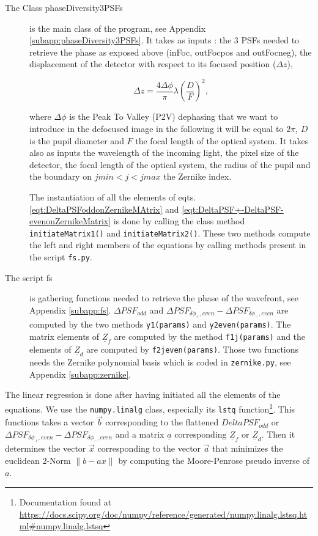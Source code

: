 \begin{description}
\item[The Class phaseDiversity3PSFs] is the main class of the program, see Appendix \ref{subapp:phaseDiversity3PSFs}. It takes as inputs : the 3 PSFs needed to retrieve the phase as exposed above (inFoc, outFocpos and outFocneg), the displacement of the detector with respect to its focused position ($\Delta z$),

\begin{equation}
\Delta z = \frac{4\Delta\phi}{\pi}\lambda \left(\frac{D}{F}\right)^2,
\label{eqt:Deltaz}
\end{equation}

where $\Delta\phi$ is the Peak To Valley (P2V) dephasing that we want to introduce in the defocused image in the following it will be equal to $2\pi$, $D$ is the pupil diameter and $F$ the focal length of the optical system. It takes also as inputs the wavelength of the incoming light, the pixel size of the detector, the focal length of the optical system, the radius of the pupil and the boundary on $jmin<j<jmax$ the Zernike index. 

The instantiation of all the elements of eqts. \eqref{eqt:DeltaPSFoddonZernikeMAtrix} and \eqref{eqt:DeltaPSF+-DeltaPSF-evenonZernikeMatrix} is done by calling the class method \verb!initiateMatrix1()! and \verb!initiateMatrix2()!. These two methods compute the left and right members of the equations by calling methods present in the script \verb!fs.py!.

\item[The script fs] is  gathering functions needed to retrieve the phase of the wavefront, see Appendix \ref{subapp:fs}. $\Delta PSF_{odd}$ and $\Delta PSF_{\delta\phi_+, even}-\Delta PSF_{\delta\phi_-, even}$ are computed by the two methods \verb!y1(params)! and \verb!y2even(params)!. The matrix elements of $\underline{Z}_f$ are computed by the method \verb!f1j(params)! and the elements of $\underline{Z}_d$ are computed by \verb!f2jeven(params)!. Those two functions needs the Zernike polynomial basis which is coded in \verb!zernike.py!, see Appendix \ref{subapp:zernike}.
\end{description}

The linear regression is done after having initiated all the elements of the equations. We use the \verb!numpy.linalg! class, especially its \verb!lstq! function\footnote{Documentation found at \url{https://docs.scipy.org/doc/numpy/reference/generated/numpy.linalg.lstsq.html\#numpy.linalg.lstsq}}. This functions takes a vector $\vec{b}$ corresponding to the flattened $Delta PSF_{odd}$ or $\Delta PSF_{\delta\phi_+, even}-\Delta PSF_{\delta\phi_-, even}$ and a matrix  $\underline{a}$ corresponding $\underline{Z}_f$ or $\underline{Z}_d$. Then it determines the vector $\vec{x}$ corresponding to the vector $\vec{a}$ that minimizes the euclidean 2-Norm $\lVert b-ax \rVert$ by computing the Moore-Penrose pseudo inverse of $\underline{a}$.

